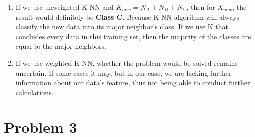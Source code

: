 \documentclass[12pt]{scrartcl}
\begin{document}
\begin{enumerate}[label=\alph*)]
    \item 
If we use unweighted K-NN and $K_{new} = N_A + N_B + N_C$, then for $X_{new}$, the result would definitely be \textbf{Class C}. Because K-NN algorithm will always classify the new data into its major neighbor's class. If we use K that concludes every data in this training set, then the majority of the classes are equal to the major neighbors.
    \item
If we use weighted K-NN, whether the problem would be solved remains uncertain. If some cases it may, but in our case, we are lacking further information about our data's feature, thus not being able to conduct further calculations.
\end{enumerate}  
  
  \section*{Problem 3}
\end{document}
